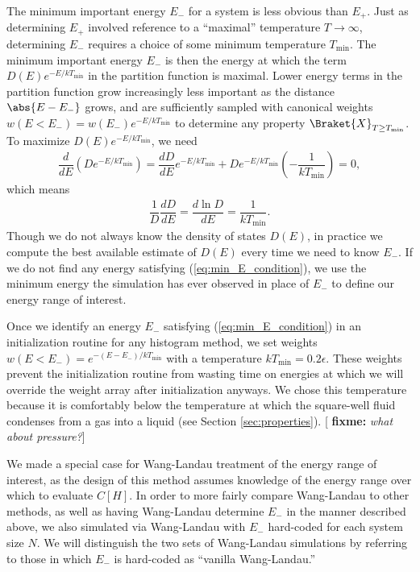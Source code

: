 \documentclass[11pt]{article}
\newcommand{\bk}{\Braket} %
\renewcommand{\t}{\text} %
\newcommand{\f}[2]{\dfrac{#1}{#2}} %
\newcommand{\p}[1]{\left(#1\right)} %
\renewcommand{\sp}[1]{\left[#1\right]} %
\newcommand{\red}[1]{{\bf \color{red} #1}}
\newcommand{\fixme}[1]{[\red{fixme:} \emph{#1}]}
\begin{document}
The minimum important energy $E_-$ for a system is less obvious than
$E_+$. Just as determining $E_+$ involved reference to a ``maximal''
temperature $T\to\infty$, determining $E_-$ requires a choice of some
minimum temperature $T_{\t{min}}$. The minimum important energy $E_-$
is then the energy at which the term $D\p{E}e^{-E/kT_{\t{min}}}$ in
the partition function is maximal. Lower energy terms in the partition
function grow increasingly less important as the distance
$\abs{E-E_-}$ grows, and are sufficiently sampled with canonical
weights $w\p{E<E_-}=w\p{E_-}e^{-E/kT_{\t{min}}}$ to determine any
property $\bk{X}_{T\ge T_{\t{min}}}$. To maximize
$D\p{E}e^{-E/kT_{\t{min}}}$, we need
\begin{align}
  \f{d}{dE}\p{De^{-E/kT_{\t{min}}}}
  =\f{dD}{dE}e^{-E/kT_{\t{min}}}+De^{-E/kT_{\t{min}}}\p{-\f{1}{kT_{\t{min}}}}=0,
  \label{eq:min_E_setup}
\end{align}
which means
\begin{align}
  \f1{D}\f{dD}{dE}=\f{d\ln D}{dE}=\f{1}{kT_{\t{min}}}.
  \label{eq:min_E_condition}
\end{align}
Though we do not always know the density of states $D\p{E}$, in
practice we compute the best available estimate of $D\p{E}$ every time
we need to know $E_-$. If we do not find any energy satisfying
(\ref{eq:min_E_condition}), we use the minimum energy the simulation
has ever observed in place of $E_-$ to define our energy range of
interest.

Once we identify an energy $E_-$ satisfying (\ref{eq:min_E_condition})
in an initialization routine for any histogram method, we set weights
$w\p{E<E_-}=e^{-\p{E-E_-}/kT_{\t{min}}}$ with a temperature
$kT_{\t{min}}=0.2\epsilon$. These weights prevent the initialization
routine from wasting time on energies at which we will override the
weight array after initialization anyways. We chose this temperature
because it is comfortably below the temperature at which the
square-well fluid condenses from a gas into a liquid (see Section
\ref{sec:properties}). \fixme{what about pressure?}

We made a special case for Wang-Landau treatment of the energy range
of interest, as the design of this method assumes knowledge of the
energy range over which to evaluate $C\sp{H}$. In order to more fairly
compare Wang-Landau to other methods, as well as having Wang-Landau
determine $E_-$ in the manner described above, we also simulated via
Wang-Landau with $E_-$ hard-coded for each system size $N$. We will
distinguish the two sets of Wang-Landau simulations by referring to
those in which $E_-$ is hard-coded as ``vanilla Wang-Landau.''
\end{document}
